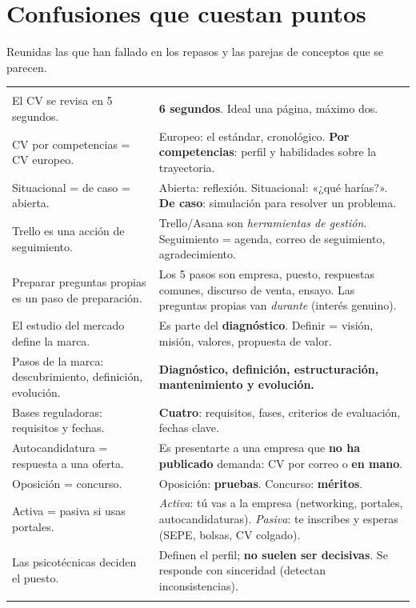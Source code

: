 \section{Confusiones que cuestan puntos}
Reunidas las que han fallado en los repasos y las parejas de conceptos que se parecen.
\begin{tabla}
\begin{tabularx}{\textwidth}{@{}Y Y@{}}
 &  \\
\midrule
El CV se revisa en 5 segundos. & \textbf{6 segundos}. Ideal una página, máximo dos. \\
CV por competencias = CV europeo. & Europeo: el estándar, cronológico. \textbf{Por competencias}: perfil y habilidades sobre la trayectoria. \\
Situacional = de caso = abierta. & Abierta: reflexión. Situacional: «¿qué harías?». \textbf{De caso}: simulación para resolver un problema. \\
Trello es una acción de seguimiento. & Trello/Asana son \emph{herramientas de gestión}. Seguimiento = agenda, correo de seguimiento, agradecimiento. \\
Preparar preguntas propias es un paso de preparación. & Los 5 pasos son empresa, puesto, respuestas comunes, discurso de venta, ensayo. Las preguntas propias van \emph{durante} (interés genuino). \\
El estudio del mercado define la marca. & Es parte del \textbf{diagnóstico}. Definir = visión, misión, valores, propuesta de valor. \\
Pasos de la marca: descubrimiento, definición, evolución. & \textbf{Diagnóstico, definición, estructuración, mantenimiento y evolución.} \\
Bases reguladoras: requisitos y fechas. & \textbf{Cuatro}: requisitos, fases, criterios de evaluación, fechas clave. \\
Autocandidatura = respuesta a una oferta. & Es presentarte a una empresa que \textbf{no ha publicado} demanda: CV por correo o \textbf{en mano}. \\
Oposición = concurso. & Oposición: \textbf{pruebas}. Concurso: \textbf{méritos}. \\
Activa = pasiva si usas portales. & \emph{Activa}: tú vas a la empresa (networking, portales, autocandidaturas). \emph{Pasiva}: te inscribes y esperas (SEPE, bolsas, CV colgado). \\
Las psicotécnicas deciden el puesto. & Definen el perfil; \textbf{no suelen ser decisivas}. Se responde con sinceridad (detectan inconsistencias). \\
\bottomrule
\end{tabularx}
\end{tabla}

